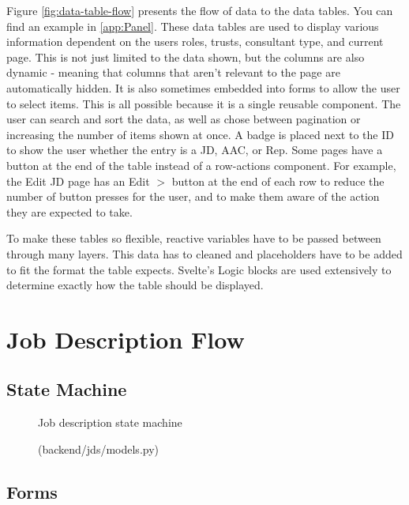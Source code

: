 Figure \ref{fig:data-table-flow} presents the flow of data to the data tables. You can find an example in \ref{app:Panel}. These data tables are used to display various information dependent on the users roles, trusts, consultant type, and current page. This is not just limited to the data shown, but the columns are also dynamic - meaning that columns that aren't relevant to the page are automatically hidden. It is also sometimes embedded into forms to allow the user to select items. This is all possible because it is a single reusable component. The user can search and sort the data, as well as chose between pagination or increasing the number of items shown at once. A badge is placed next to the ID to show the user whether the entry is a JD, AAC, or Rep. Some pages have a button at the end of the table instead of a row-actions component. For example, the Edit JD page has an Edit $>$ button at the end of each row to reduce the number of button presses for the user, and to make them aware of the action they are expected to take.

To make these tables so flexible, reactive variables have to be passed between through many layers. This data has to cleaned and placeholders have to be added to fit the format the table expects. Svelte's Logic blocks are used extensively to determine exactly how the table should be displayed.


\section{Job Description Flow}
\subsection{State Machine}
\begin{figure}[h]
\centering
{}
\vspace{-20pt}
\caption{Job description state machine}
\vspace{-10pt}
\caption*{(backend/jds/models.py)}
\label{fig:jd-state}
\vspace{-5pt}
\end{figure}

\subsection{Forms}

